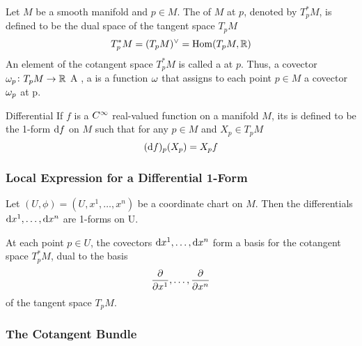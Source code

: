 Let \(M\) be a smooth manifold and \(p \in M\).
The  of \(M\) at \(p\), denoted by \(T_p^* M\), is defined to be the dual space of the tangent space \(T_p M\)
\[
    T_p^* M = (T_p M)^{\vee} = \operatorname{Hom}(T_p M, \mathbb{R})   
\]
An element of the cotangent space \(T_p^* M\) is called a  at \(p\).
Thus, a covector \(\omega_p \colon T_p M \rightarrow \mathbb{R}\)
A , a  is a function \(\omega\) that assigns to each point \(p \in M\) a covector \(\omega_p\) at p.

\begin{definition}{Differential}{}
    If \(f\) is a \(C^\infty\) real-valued function on a manifold \(M\), its  is defined to be the 1-form \(\dif f\) on \(M\) such that for any \(p \in M\) and \(X_p \in T_p M\)
    \[
        (\dif f)_p (X_p) = X_p f
    \]  
\end{definition}

\subsubsection{Local Expression for a Differential 1-Form}

Let \((U, \phi) = (U, x^1, \dots, x^n)\) be a coordinate chart on \(M\).
Then the differentials \(\dif x^1, \dots, \dif x^n\) are 1-forms on U.

\begin{proposition}{}{}
    At each point \(p \in U\), the covectors \(\dif x^1, \dots, \dif x^n\) form a basis for the cotangent space \(T_p^* M\), dual to the basis 
    \[
        \pdv{x^1}, \dots, \pdv{x^n}    
    \]
    of the tangent space \(T_p M\).
\end{proposition}

\subsubsection{The Cotangent Bundle}
